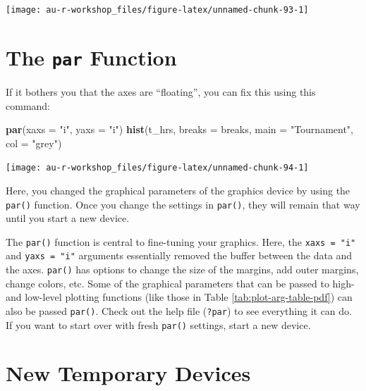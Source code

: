 \documentclass[]{book}
\newenvironment{Shaded}{\begin{snugshade}}{\end{snugshade}}
\newcommand{\KeywordTok}[1]{\textcolor[rgb]{0.13,0.29,0.53}{\textbf{#1}}}
\newcommand{\DataTypeTok}[1]{\textcolor[rgb]{0.13,0.29,0.53}{#1}}
\newcommand{\StringTok}[1]{\textcolor[rgb]{0.31,0.60,0.02}{#1}}
\newcommand{\NormalTok}[1]{#1}
\theoremstyle{definition}
\theoremstyle{definition}
\theoremstyle{definition}
\theoremstyle{remark}
\begin{document}
\begin{center}\texttt{[image: au-r-workshop\_files/figure-latex/unnamed-chunk-93-1]} \end{center}

\section{\texorpdfstring{The \texttt{par}
Function}{The par Function}}\label{the-par-function}

If it bothers you that the axes are ``floating'', you can fix this using
this command:

\begin{Shaded}
\begin{Highlighting}[]
\KeywordTok{par}\NormalTok{(}\DataTypeTok{xaxs =} \StringTok{"i"}\NormalTok{, }\DataTypeTok{yaxs =} \StringTok{"i"}\NormalTok{)}
\KeywordTok{hist}\NormalTok{(t_hrs, }\DataTypeTok{breaks =}\NormalTok{ breaks, }\DataTypeTok{main =} \StringTok{"Tournament"}\NormalTok{, }\DataTypeTok{col =} \StringTok{"grey"}\NormalTok{)}
\end{Highlighting}
\end{Shaded}

\begin{center}\texttt{[image: au-r-workshop\_files/figure-latex/unnamed-chunk-94-1]} \end{center}

Here, you changed the graphical parameters of the graphics device by
using the \texttt{par()} function. Once you change the settings in
\texttt{par()}, they will remain that way until you start a new device.

The \texttt{par()} function is central to fine-tuning your graphics.
Here, the \texttt{xaxs\ =\ "i"} and \texttt{yaxs\ =\ "i"} arguments
essentially removed the buffer between the data and the axes.
\texttt{par()} has options to change the size of the margins, add outer
margins, change colors, etc. Some of the graphical parameters that can
be passed to high- and low-level plotting functions (like those in Table
\ref{tab:plot-arg-table-pdf}) can also be passed \texttt{par()}. Check
out the help file (\texttt{?par}) to see everything it can do. If you
want to start over with fresh \texttt{par()} settings, start a new
device.

\section{New Temporary Devices}\label{new-temporary-devices}
\end{document}
